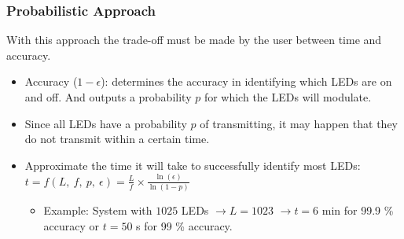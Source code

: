 \documentclass{beamer}
\begin{document}
	\begin{frame}\frametitle{Probabilistic Approach}

		With this approach the trade-off must be made by the user between time and accuracy.

		\begin{itemize}

			\item Accuracy ($1 - \epsilon$): determines the accuracy in identifying which LEDs are on and off. And outputs a probability $p$ for which the LEDs will modulate.

			\item Since all LEDs have a probability $p$ of transmitting, it may happen that they do not transmit within a certain time.


			\item Approximate the time it will take to successfully identify most LEDs: $t = f(L,\ f,\ p,\ \epsilon) = \frac{L}{f} \times \frac{\ln(\epsilon)}{\ln(1 - p)}$

			\begin{itemize}
				\item Example: System with $1025$ LEDs $\rightarrow L = 1023$ $\rightarrow t = 6$ min for 99.9 \% accuracy or $t = 50$ s for 99 \% accuracy.
			\end{itemize}

		\end{itemize}
		
	\end{frame}
\end{document}
